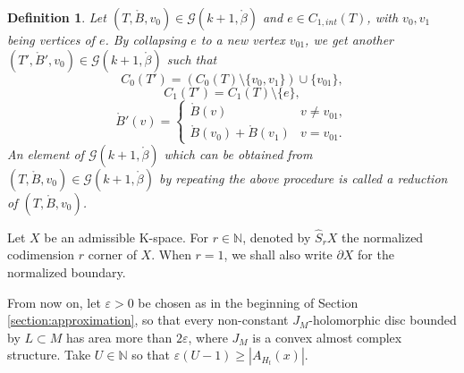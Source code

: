 \documentclass[a4paper]{article}
\newtheorem{definition}[theorem]{Definition}
\numberwithin{equation}{section}
\begin{document}
\begin{definition}\label{definition:reduction}
Let $(T,\ring{B},v_0)\in\mathcal{G}(k+1,\ring{\beta})$ and $e\in C_{1,\mathit{int}}(T)$, with $v_0,v_1$ being vertices of $e$. By collapsing $e$ to a new vertex $v_{01}$, we get another $(T',\ring{B}',v_0)\in\mathcal{G}(k+1,\ring{\beta})$ such that
\begin{equation}
C_0(T')=\left(C_0(T)\setminus\{v_0,v_1\}\right)\cup\{v_{01}\},
\end{equation}
\begin{equation}
C_1(T')=C_1(T)\setminus\{e\},
\end{equation}
\begin{equation}
\ring{B}'(v)=\left\{\begin{array}{ll}
\ring{B}(v) & v\neq v_{01}, \\ \ring{B}(v_0)+\ring{B}(v_1) & v=v_{01}.
\end{array}\right.
\end{equation}
An element of $\mathcal{G}(k+1,\ring{\beta})$ which can be obtained from $(T,\ring{B},v_0)\in\mathcal{G}(k+1,\ring{\beta})$ by repeating the above procedure is called a reduction of $(T,\ring{B},v_0)$.
\end{definition}

Let $X$ be an admissible K-space. For $r\in\mathbb{N}$, denoted by $\widehat{S}_rX$ the normalized codimension $r$ corner of $X$. When $r=1$, we shall also write $\partial X$ for the normalized boundary.

From now on, let $\varepsilon>0$ be chosen as in the beginning of Section \ref{section:approximation}, so that every non-constant $J_M$-holomorphic disc bounded by $L\subset M$ has area more than $2\varepsilon$, where $J_M$ is a convex almost complex structure. Take $U\in\mathbb{N}$ so that $\varepsilon(U-1)\geq|A_{H_t}(x)|$.
\end{document}
